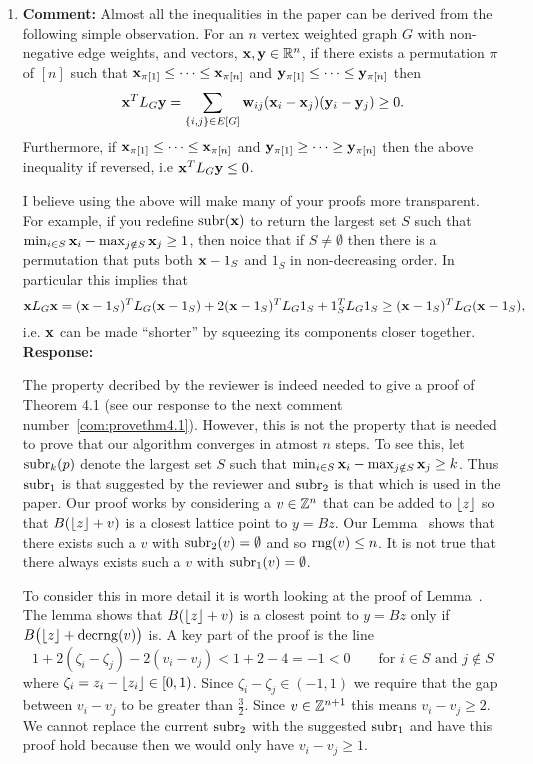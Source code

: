 \documentclass[a4paper,10pt]{article}
\begin{document}
\begin{enumerate}
\item\textbf{Comment:} \label{com:uselaplaicesubr1}
Almost all the inequalities in the paper can be derived from the following simple observation.  For an $n$ vertex weighted graph $G$ with non-negative edge weights, and vectors, $\mathbf{x},\mathbf{y} \in {\mathbb R}^n$, if there exists a permutation $\pi$ of $[n]$ such that $\mathbf{x}_{\pi[1]} \leq \dots \leq \mathbf{x}_{\pi[n]}$ and $\mathbf{y}_{\pi[1]} \leq \dots \leq \mathbf{y}_{\pi[n]}$ then
\[
\mathbf{x}^T L_G \mathbf{y} = \sum_{ \{i,j\} \in E[G] } \mathbf{w}_{ij} (\mathbf{x}_{i} - \mathbf{x}_{j}) (\mathbf{y}_{i} - \mathbf{y}_{j}) \geq 0.
\]
Furthermore, if $\mathbf{x}_{\pi[1]} \leq \dots \leq \mathbf{x}_{\pi[n]}$ and $\mathbf{y}_{\pi[1]} \geq \dots \geq \mathbf{y}_{\pi[n]}$ then the above inequality if reversed, i.e $\mathbf{x}^T L_G \mathbf{y} \leq 0$. 

I believe using the above will make many of your proofs more transparent.  For example, if you redefine $\operatorname{subr}(\mathbf{x})$ to return the largest set $S$ such that $\min_{i\in S} \mathbf{x}_i - \max_{j \notin S} \mathbf{x}_j \geq 1$, then noice that if $S \neq \emptyset$ then there is a permutation that puts both $\mathbf{x} - 1_S$ and $1_S$ in non-decreasing order. In particular this implies that
\[
\mathbf{x} L_G \mathbf{x} = (\mathbf{x} - 1_S)^T L_G (\mathbf{x} - 1_S) + 2(\mathbf{x} - 1_S)^T L_G 1_S + 1_S^T L_G 1_S \geq (\mathbf{x} - 1_S)^T L_G (\mathbf{x} - 1_S),
\]
i.e. $\mathbf{x}$ can be made ``shorter'' by squeezing its components closer together.
\\\textbf{Response:}

The property decribed by the reviewer is indeed needed to give a proof of Theorem 4.1 (see our response to the next comment number~\ref{com:provethm4.1}).  However, this is not the property that is needed to prove that our algorithm converges in atmost $n$ steps.  To see this, let $\operatorname{subr}_k(p)$ denote the largest set $S$ such that $\min_{i\in S} \mathbf{x}_i - \max_{j \notin S} \mathbf{x}_j \geq k$. Thus $\operatorname{subr}_1$ is that suggested by the reviewer and $\operatorname{subr}_2$ is that which is used in the paper.  Our proof works by considering a $v \in {\mathbb Z}^n$ that can be added to ${\left\lfloor z \right\rfloor}$ so that $B({\left\lfloor z \right\rfloor} + v)$ is a closest lattice point to $y = Bz$.  Our Lemma~ shows that there exists such a $v$ with $\operatorname{subr}_2(v) = \emptyset$ and so $\operatorname{rng}(v) \leq n$.  It is not true that there always exists such a $v$ with  $\operatorname{subr}_1(v) = \emptyset$.

To consider this in more detail it is worth looking at the proof of Lemma~.  The lemma shows that $B({\left\lfloor z \right\rfloor} + v)$ is a closest point to $y = Bz$ only if $B\big({\left\lfloor z \right\rfloor} + \operatorname{decrng}(v)\big)$ is.  A key part of the proof is the line
\[
1 + 2(\zeta_i-\zeta_j) - 2(v_i - v_j) < 1 + 2 - 4 = -1 < 0 \qquad \text{for $i \in S$ and $j \notin S$}
\]
where $\zeta_i = z_i - {\left\lfloor z_i \right\rfloor} \in [0,1)$.  Since $\zeta_i-\zeta_j \in (-1,1)$ we require that the gap between $v_i - v_j$ to be greater than $\tfrac{3}{2}$.  Since $v \in {\mathbb Z}^{n+1}$ this means $v_i - v_j \geq 2$.  We cannot replace the current $\operatorname{subr}_2$ with the suggested $\operatorname{subr}_1$ and have this proof hold because then we would only have $v_i - v_j \geq 1$.


\end{enumerate}
\end{document}
